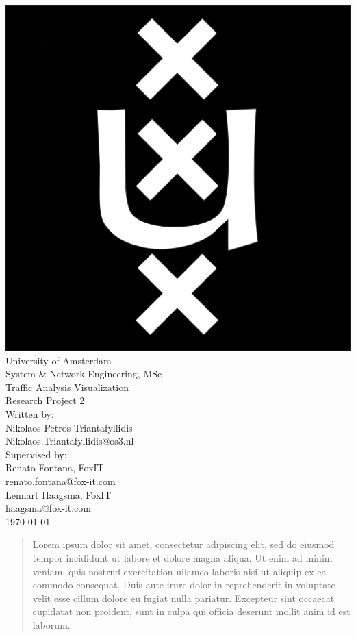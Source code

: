 \documentclass[16pt]{extreport}
\begin{document}
\begin{center}
\includegraphics[scale=0.07]{logo.png}\\
\huge{University of Amsterdam}\\
\huge{System \& Network Engineering, MSc}\\[1cm]
\Huge{Traffic Analysis Visualization}\\[0.2cm] 
\Large{Research Project 2}\\[2cm]
\large{Written by:}\\
\Large{Nikolaos Petros Triantafyllidis}\\
\large{Nikolaos.Triantafyllidis@os3.nl}\\[0.3cm]
\large{Supervised by:}\\
\Large{Renato Fontana, FoxIT}\\
\large{renato.fontana@fox-it.com}\\[0.1cm]
\Large{Lennart Haagsma, FoxIT}\\
\large{haagsma@fox-it.com}\\[4cm]
\today
\end{center}
\thispagestyle{empty}
\clearpage

\begin{abstract}
\parbox{\linewidth}{
\justify
\normalsize{
Lorem ipsum dolor sit amet, consectetur adipiscing elit, sed do eiusmod tempor incididunt ut labore et dolore magna aliqua. Ut enim ad minim veniam, quis nostrud exercitation ullamco laboris nisi ut aliquip ex ea commodo consequat. Duis aute irure dolor in reprehenderit in voluptate velit esse cillum dolore eu fugiat nulla pariatur. Excepteur sint occaecat cupidatat non proident, sunt in culpa qui officia deserunt mollit anim id est laborum.}}
\end{abstract}
\end{document}
